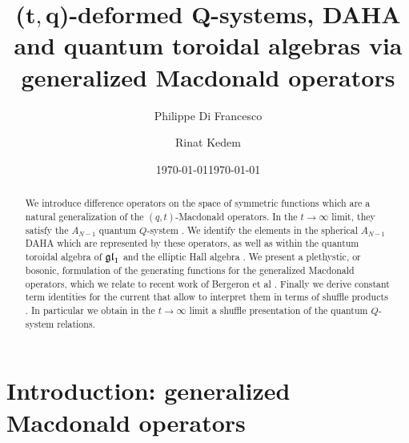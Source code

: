 \documentclass[12pt]{amsart}
\begin{document}
\title[$(t,q)$ Q-systems, DAHA and quantum toroidal algebras]{(${\mathbf  t},{\mathbf q}$)-deformed Q-systems, DAHA and quantum toroidal algebras via generalized Macdonald operators}
\author{Philippe Di Francesco} 
\address{PDF: Department of Mathematics, University of Illinois MC-382, Urbana, IL 61821, U.S.A. e-mail: philippe@illinois.edu}
\author{Rinat Kedem}
\address{RK: Department of Mathematics, University of Illinois MC-382, Urbana, IL 61821, U.S.A. e-mail: rinat@illinois.edu}
\date{\today}
\begin{abstract}
We introduce difference operators on the space of symmetric functions which are a natural generalization of the $(q,t)$-Macdonald operators. In the $t\to\infty$ limit, they satisfy the $A_{N-1}$ quantum $Q$-system \cite{qKR,DFK15}. We identify the elements in the spherical $A_{N-1}$ DAHA \cite{Cheredbook} which are represented by these operators, as well as within the quantum toroidal algebra of ${\mathfrak{gl}}_1$ \cite{FJMM} and the elliptic Hall algebra \cite{SHIVAS,BS,SCHIFFEHA}.
We present a plethystic, or bosonic, formulation of the generating functions for the generalized Macdonald operators, which we relate to recent work of Bergeron et al \cite{BGLX}. Finally we derive constant term identities for the current that allow to interpret them in terms of shuffle products \cite{NegutShuffle}.
In particular we obtain in the $t\to\infty$ limit a shuffle presentation of the quantum $Q$-system relations.
\end{abstract}


\maketitle
\date{\today}
\tableofcontents
\section{Introduction: generalized Macdonald operators}

%
%
\end{document}
